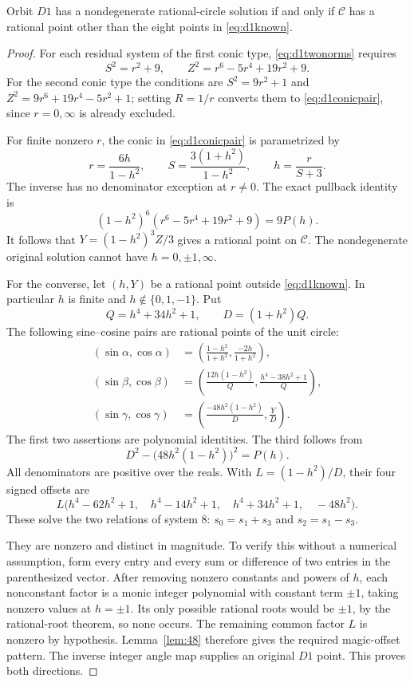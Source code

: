 \begin{theorem}\label{thm:d1equivalence}
Orbit $D1$ has a nondegenerate rational-circle solution if and only if $\mathcal C$ has a rational point other than the eight points in \eqref{eq:d1known}.
\end{theorem}
\begin{proof}
For each residual system of the first conic type, \eqref{eq:d1twonorms} requires
\begin{equation}\label{eq:d1conicpair}
 S^2=r^2+9,\qquad Z^2=r^6-5r^4+19r^2+9.
\end{equation}
For the second conic type the conditions are $S^2=9r^2+1$ and $Z^2=9r^6+19r^4-5r^2+1$; setting $R=1/r$ converts them to \eqref{eq:d1conicpair}, since $r=0,\infty$ is already excluded.

For finite nonzero $r$, the conic in \eqref{eq:d1conicpair} is parametrized by
\[
 r=\frac{6h}{1-h^2},\qquad S=\frac{3(1+h^2)}{1-h^2},\qquad
 h=\frac{r}{S+3}.
\]
The inverse has no denominator exception at $r\ne0$. The exact pullback identity is
\[
 (1-h^2)^6\left(r^6-5r^4+19r^2+9\right)=9P(h).
\]
It follows that $Y=(1-h^2)^3Z/3$ gives a rational point on $\mathcal C$. The nondegenerate original solution cannot have $h=0,\pm1,\infty$.

For the converse, let $(h,Y)$ be a rational point outside \eqref{eq:d1known}. In particular $h$ is finite and $h\notin\{0,1,-1\}$. Put
\[
 Q=h^4+34h^2+1,\qquad D=(1+h^2)Q.
\]
The following sine--cosine pairs are rational points of the unit circle:
\begin{align*}
 (\sin\alpha,\cos\alpha)&=\left(\frac{1-h^2}{1+h^2},\frac{-2h}{1+h^2}\right),\\
 (\sin\beta,\cos\beta)&=\left(\frac{12h(1-h^2)}{Q},\frac{h^4-38h^2+1}{Q}\right),\\
 (\sin\gamma,\cos\gamma)&=\left(\frac{-48h^2(1-h^2)}{D},\frac{Y}{D}\right).
\end{align*}
The first two assertions are polynomial identities. The third follows from
\[
 D^2-\bigl(48h^2(1-h^2)\bigr)^2=P(h).
\]
All denominators are positive over the reals. With $L=(1-h^2)/D$, their four signed offsets are
\begin{equation}\label{eq:d1reconstructed}
 L\bigl(h^4-62h^2+1,\quad h^4-14h^2+1,\quad h^4+34h^2+1,\quad-48h^2\bigr).
\end{equation}
These solve the two relations of system 8: $s_0=s_1+s_3$ and $s_2=s_1-s_3$.

They are nonzero and distinct in magnitude. To verify this without a numerical assumption, form every entry and every sum or difference of two entries in the parenthesized vector. After removing nonzero constants and powers of $h$, each nonconstant factor is a monic integer polynomial with constant term $\pm1$, taking nonzero values at $h=\pm1$. Its only possible rational roots would be $\pm1$, by the rational-root theorem, so none occurs. The remaining common factor $L$ is nonzero by hypothesis. Lemma~\ref{lem:48} therefore gives the required magic-offset pattern. The inverse integer angle map supplies an original $D1$ point. This proves both directions.
\end{proof}

